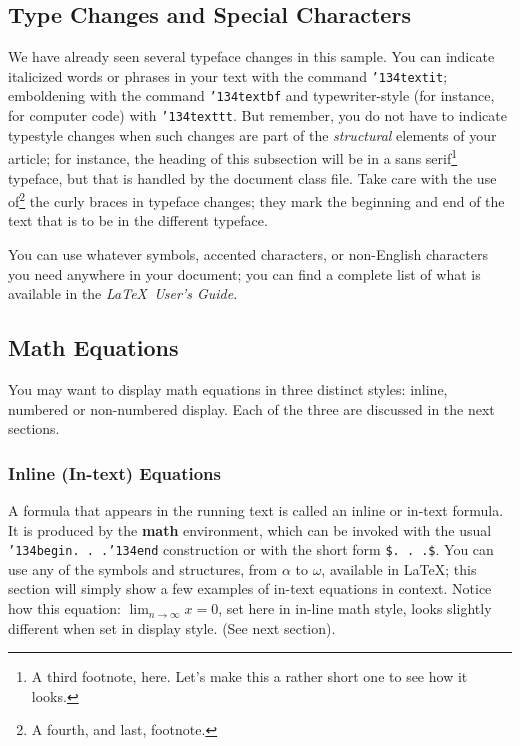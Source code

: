 \documentclass{sig-alternate}
\begin{document}
\subsection{Type Changes and {\subsecit Special} Characters}
We have already seen several typeface changes in this sample.  You
can indicate italicized words or phrases in your text with
the command \texttt{{\char'134}textit}; emboldening with the
command \texttt{{\char'134}textbf}
and typewriter-style (for instance, for computer code) with
\texttt{{\char'134}texttt}.  But remember, you do not
have to indicate typestyle changes when such changes are
part of the \textit{structural} elements of your
article; for instance, the heading of this subsection will
be in a sans serif\footnote{A third footnote, here.
Let's make this a rather short one to
see how it looks.} typeface, but that is handled by the
document class file. Take care with the use
of\footnote{A fourth, and last, footnote.}
the curly braces in typeface changes; they mark
the beginning and end of
the text that is to be in the different typeface.

You can use whatever symbols, accented characters, or
non-English characters you need anywhere in your document;
you can find a complete list of what is
available in the \textit{\LaTeX\
User's Guide}.

\subsection{Math Equations}
You may want to display math equations in three distinct styles:
inline, numbered or non-numbered display.  Each of
the three are discussed in the next sections.

\subsubsection{Inline (In-text) Equations}
A formula that appears in the running text is called an
inline or in-text formula.  It is produced by the
\textbf{math} environment, which can be
invoked with the usual \texttt{{\char'134}begin. . .{\char'134}end}
construction or with the short form \texttt{\$. . .\$}. You
can use any of the symbols and structures,
from $\alpha$ to $\omega$, available in
\LaTeX; this section will simply show a
few examples of in-text equations in context. Notice how
this equation: \begin{math}\lim_{n\rightarrow \infty}x=0\end{math},
set here in in-line math style, looks slightly different when
set in display style.  (See next section).
\end{document}
